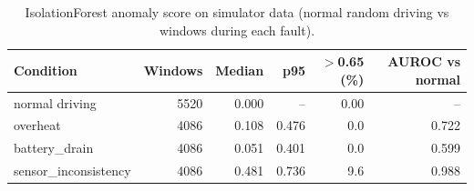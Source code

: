 \begin{table}[t]
\centering
\caption{IsolationForest anomaly score on simulator data (normal random driving vs windows during each fault).}
\label{tab:sys_anomaly}
\footnotesize
\begin{tabular}{lrrrrr}
\toprule
Condition & Windows & Median & p95 & $>$0.65 (\%) & AUROC vs normal \\
\midrule
normal driving & 5520 & 0.000 & -- & 0.00 & -- \\
overheat & 4086 & 0.108 & 0.476 & 0.0 & 0.722 \\
battery\_drain & 4086 & 0.051 & 0.401 & 0.0 & 0.599 \\
sensor\_inconsistency & 4086 & 0.481 & 0.736 & 9.6 & 0.988 \\
\bottomrule
\end{tabular}
\end{table}
